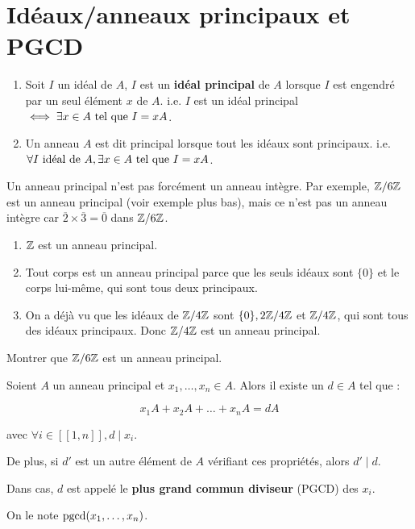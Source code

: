 \documentclass[12pt, a4paper]{report}
\begin{document}
\section{Idéaux/anneaux principaux et PGCD}

\begin{definition}
    \begin{enumerate}
        \item Soit $I$ un idéal de $A$, $I$ est un \textbf{idéal principal} de $A$ lorsque $I$ est engendré par un seul élément $x$ de $A$. i.e. $I$ est un idéal principal $\iff \exists x \in A \text{ tel que } I = xA$.
        \item Un anneau $A$ est dit principal lorsque tout les idéaux sont principaux. i.e. $\forall I \text{ idéal de } A, \exists x \in A \text{ tel que } I = xA$.
    \end{enumerate}
\end{definition}


\begin{attention}
    Un anneau principal n'est pas forcément un anneau intègre. Par exemple, $\mathbb{Z}/6\mathbb{Z}$ est un anneau principal (voir exemple plus bas), mais ce n'est pas un anneau intègre car $\overline{2} \times \overline{3} = \overline{0}$ dans $\mathbb{Z}/6\mathbb{Z}$.
\end{attention}

\begin{example}
    \begin{enumerate}
        \item $\mathbb{Z}$ est un anneau principal.
        \item Tout corps est un anneau principal parce que les seuls idéaux sont $\{0\}$ et le corps lui-même, qui sont tous deux principaux.
        \item On a déjà vu que les idéaux de $\mathbb{Z}/4\mathbb{Z}$ sont $\{0\}, 2\mathbb{Z}/4\mathbb{Z}$ et $\mathbb{Z}/4\mathbb{Z}$, qui sont tous des idéaux principaux. Donc $\mathbb{Z}/4\mathbb{Z}$ est un anneau principal.
    \end{enumerate}
\end{example}

\begin{exercise}
    Montrer que $\mathbb{Z}/6\mathbb{Z}$ est un anneau principal.
\end{exercise}

\begin{theorem}
    Soient $A$ un anneau principal et $x_1,\dots,x_n \in A$. Alors il existe un $d \in A$ tel que :

    $$x_1 A + x_2 A + \dots + x_n A = dA$$

    avec $\forall i \in [\![1,n]\!], d \mid x_i$.

    De plus, si $d'$ est un autre élément de $A$ vérifiant ces propriétés, alors $d' \mid d$.

    Dans cas, $d$ est appelé le \textbf{plus grand commun diviseur} (PGCD) des $x_i$.

    On le note $\mathrm{pgcd}(x_1,\dots,x_n)$.
\end{theorem}
\end{document}
